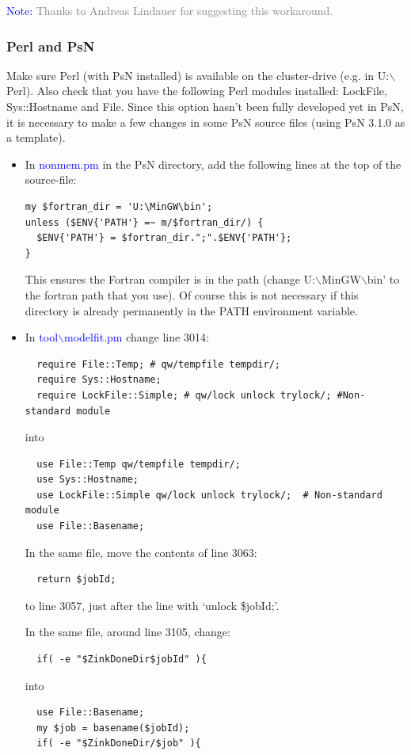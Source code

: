 \documentclass[a4,11pt]{report} \usepackage[pdftex]{graphicx}
\begin{document}
{{\vspace{8pt}
\noindent\scriptsize{\textcolor{Blue}{Note:} \textcolor{Grey}{Thanks
to Andreas Lindauer for suggesting this workaround.  } \normalsize


\subsubsection*{Perl and PsN} Make sure Perl (with
PsN installed) is available on the cluster-drive (e.g. in
U:$\backslash$Perl). Also check that you have the following Perl
modules installed: LockFile, Sys::Hostname and File.  Since this
option hasn't been fully developed yet in PsN, it is necessary to make
a few changes in some PsN source files (using PsN 3.1.0 as a
template).
\begin{itemize}
\item In \textcolor{Blue}{nonmem.pm} in the PsN directory, add the
following lines at the top of the source-file:
\begin{verbatim}
my $fortran_dir = 'U:\MinGW\bin';
unless ($ENV{'PATH'} =~ m/$fortran_dir/) {
  $ENV{'PATH'} = $fortran_dir.";".$ENV{'PATH'};
}
\end{verbatim} This ensures the Fortran compiler is in the path
(change U:$\backslash$MinGW$\backslash$bin' to the fortran path that
you use). Of course this is not necessary if this directory is
already permanently in the PATH environment variable.

\item In \textcolor{Blue}{tool$\backslash$modelfit.pm} change line
3014:
\begin{verbatim}
  require File::Temp; # qw/tempfile tempdir/;
  require Sys::Hostname;
  require LockFile::Simple; # qw/lock unlock trylock/; #Non-standard module
\end{verbatim}
into
\begin{verbatim}
  use File::Temp qw/tempfile tempdir/;
  use Sys::Hostname;
  use LockFile::Simple qw/lock unlock trylock/;  # Non-standard module
  use File::Basename;
\end{verbatim}

In the same file, move the contents of line 3063:
\begin{verbatim}
  return $jobId;
\end{verbatim}
to line 3057, just after the line with `unlock \$jobId;'.

In the same file, around line 3105, change:
\begin{verbatim}
  if( -e "$ZinkDoneDir$jobId" ){
\end{verbatim}
into
\begin{verbatim}
  use File::Basename;
  my $job = basename($jobId);
  if( -e "$ZinkDoneDir/$job" ){
\end{verbatim}


\end{itemize}}}}
\end{document}
